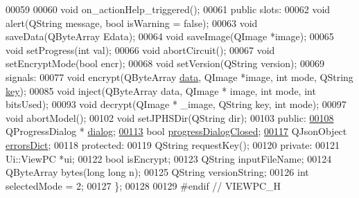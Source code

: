 \begin{DoxyCode}
00059 
00060     \textcolor{keywordtype}{void} on\_actionHelp\_triggered();
00061 \textcolor{keyword}{public} slots:
00062     \textcolor{keywordtype}{void} alert(QString message, \textcolor{keywordtype}{bool} isWarning = \textcolor{keyword}{false});
00063     \textcolor{keywordtype}{void} saveData(QByteArray Edata);
00064     \textcolor{keywordtype}{void} saveImage(QImage *image);
00065     \textcolor{keywordtype}{void} setProgress(\textcolor{keywordtype}{int} val);
00066     \textcolor{keywordtype}{void} abortCircuit();
00067     \textcolor{keywordtype}{void} setEncryptMode(\textcolor{keywordtype}{bool} encr);
00068     \textcolor{keywordtype}{void} setVersion(QString version);
00069 signals:
00077     \textcolor{keywordtype}{void} encrypt(QByteArray \hyperlink{namespace_errors_dict_setup_af570460846fb9f0c91abd308a095dcdc}{data}, QImage *image, \textcolor{keywordtype}{int} mode, QString \hyperlink{namespace_errors_dict_setup_a09c268098d09ffb8e5504f30fa6d5dd9}{key});
00085     \textcolor{keywordtype}{void} inject(QByteArray data, QImage * image, \textcolor{keywordtype}{int} mode, \textcolor{keywordtype}{int} bitsUsed);
00093     \textcolor{keywordtype}{void} decrypt(QImage * \_image, QString key, \textcolor{keywordtype}{int} mode);
00097     \textcolor{keywordtype}{void} abortModel();
00102     \textcolor{keywordtype}{void} setJPHSDir(QString dir);
00103 \textcolor{keyword}{public}:
\hypertarget{viewpc_8h_source.tex_l00108}{}\hyperlink{class_view_p_c_a31abbb470fe329b44e6ffee202b903ca}{00108}     QProgressDialog * \hyperlink{class_view_p_c_a31abbb470fe329b44e6ffee202b903ca}{dialog};
\hypertarget{viewpc_8h_source.tex_l00113}{}\hyperlink{class_view_p_c_add8c82aa2b0b934212aa5bde9277ab36}{00113}     \textcolor{keywordtype}{bool} \hyperlink{class_view_p_c_add8c82aa2b0b934212aa5bde9277ab36}{progressDialogClosed};
\hypertarget{viewpc_8h_source.tex_l00117}{}\hyperlink{class_view_p_c_a26f90436aca32e5bad46f5e69a7e7e09}{00117}     QJsonObject \hyperlink{class_view_p_c_a26f90436aca32e5bad46f5e69a7e7e09}{errorsDict};
00118 \textcolor{keyword}{protected}:
00119     QString requestKey();
00120 \textcolor{keyword}{private}:
00121     Ui::ViewPC *ui;
00122     \textcolor{keywordtype}{bool} isEncrypt;
00123     QString inputFileName;
00124     QByteArray bytes(\textcolor{keywordtype}{long} \textcolor{keywordtype}{long} n);
00125     QString versionString;
00126     \textcolor{keywordtype}{int} selectedMode = 2;
00127 \};
00128 
00129 \textcolor{preprocessor}{#endif // VIEWPC\_H}
\end{DoxyCode}
